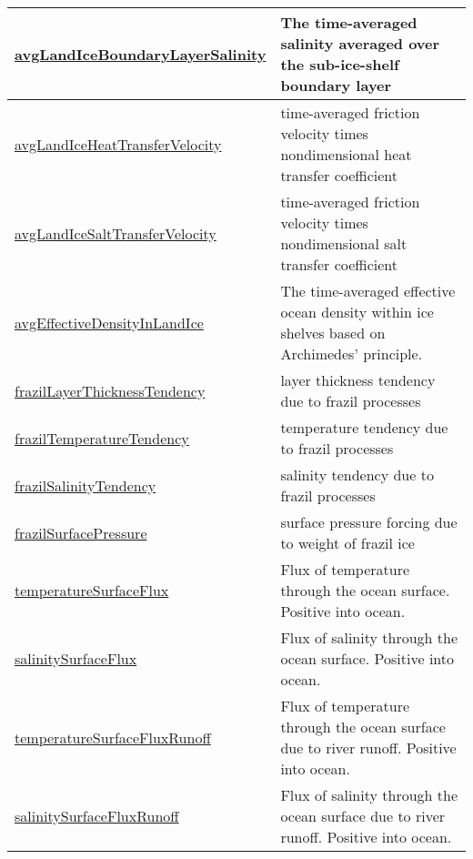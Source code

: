 {\begin{center}
\begin{longtable}{| p{2.0in} | p{4.0in} |}
    \hline
    \hyperref[subsec:var_sec_forcing_avgLandIceBoundaryLayerSalinity]{avgLandIceBoundaryLayer\-Salinity} & The time-averaged salinity averaged over the sub-ice-shelf boundary layer \\
    \hline
    \hyperref[subsec:var_sec_forcing_avgLandIceHeatTransferVelocity]{avgLandIceHeatTransferVelocity} & time-averaged friction velocity times nondimensional heat transfer coefficient \\
    \hline
    \hyperref[subsec:var_sec_forcing_avgLandIceSaltTransferVelocity]{avgLandIceSaltTransferVelocity} & time-averaged friction velocity times nondimensional salt transfer coefficient \\
    \hline
    \hyperref[subsec:var_sec_forcing_avgEffectiveDensityInLandIce]{avgEffectiveDensityInLandIce} & The time-averaged effective ocean density within ice shelves based on Archimedes' principle. \\
    \hline
    \hyperref[subsec:var_sec_forcing_frazilLayerThicknessTendency]{frazilLayerThicknessTendency} & layer thickness tendency due to frazil processes \\
    \hline
    \hyperref[subsec:var_sec_forcing_frazilTemperatureTendency]{frazilTemperatureTendency} & temperature tendency due to frazil processes \\
    \hline
    \hyperref[subsec:var_sec_forcing_frazilSalinityTendency]{frazilSalinityTendency} & salinity tendency due to frazil processes \\
    \hline
    \hyperref[subsec:var_sec_forcing_frazilSurfacePressure]{frazilSurfacePressure} & surface pressure forcing due to weight of frazil ice \\
    \hline
    \hyperref[subsec:var_sec_forcing_temperatureSurfaceFlux]{temperatureSurfaceFlux} & Flux of temperature through the ocean surface. Positive into ocean. \\
    \hline
    \hyperref[subsec:var_sec_forcing_salinitySurfaceFlux]{salinitySurfaceFlux} & Flux of salinity through the ocean surface. Positive into ocean. \\
    \hline
    \hyperref[subsec:var_sec_forcing_temperatureSurfaceFluxRunoff]{temperatureSurfaceFluxRunoff} & Flux of temperature through the ocean surface due to river runoff. Positive into ocean. \\
    \hline
    \hyperref[subsec:var_sec_forcing_salinitySurfaceFluxRunoff]{salinitySurfaceFluxRunoff} & Flux of salinity through the ocean surface due to river runoff. Positive into ocean. \\

\end{longtable}
\end{center}}
